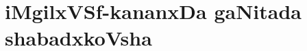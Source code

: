 \makeatletter
\def\@makechapterhead#1{%
  \vspace*{-25\p@}%
  {\parindent \z@ \raggedleft \normalfont
    \ifnum \c@secnumdepth >\m@ne
      \if@mainmatter
        \centering\Large\bfseries \vskip 2pt
        \par\nobreak
        \vskip 1\p@
      \fi
    \fi
    \interlinepenalty\@M
    \huge \bfseries #1\par\nobreak
\vskip 5pt

 \vskip 5\p@  
  }}
\makeatother

\chapter{iMgilxVSf-kananxDa gaNitada shabadxkoVsha}


